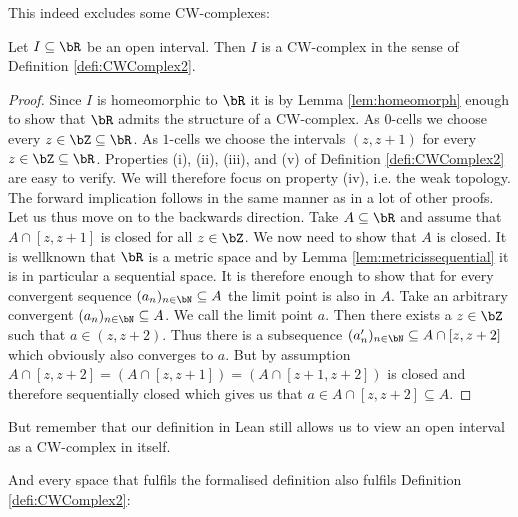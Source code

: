 This indeed excludes some CW-complexes:

\begin{example}
  Let $I \subseteq \bR$ be an open interval.
  Then $I$ is a CW-complex in the sense of Definition \ref{defi:CWComplex2}.
\end{example}
\begin{proof}
  Since $I$ is homeomorphic to $\bR$ it is by Lemma \ref{lem:homeomorph} enough to show that $\bR$ admits the structure of a CW-complex.
  As $0$-cells we choose every $z \in \bZ \subseteq \bR$.
  As $1$-cells we choose the intervals $(z, z + 1)$ for every $z \in \bZ \subseteq \bR$.
  Properties (i), (ii), (iii), and (v) of Definition \ref{defi:CWComplex2} are easy to verify.
  We will therefore focus on property (iv), i.e. the weak topology.
  The forward implication follows in the same manner as in a lot of other proofs.
  Let us thus move on to the backwards direction.
  Take $A \subseteq \bR$ and assume that $A \cap [z, z + 1]$ is closed for all $z \in \bZ$.
  We now need to show that $A$ is closed.
  It is wellknown that $\bR$ is a metric space and by Lemma \ref{lem:metricissequential} it is in particular a sequential space.
  It is therefore enough to show that for every convergent sequence $(a_n)_{n \in \bN} \subseteq A$ the limit point is also in $A$.
  Take an arbitrary convergent $(a_n)_{n \in \bN} \subseteq A$.
  We call the limit point $a$.
  Then there exists a $z \in \bZ$ such that $a \in (z, z + 2)$.
  Thus there is a subsequence $(a'_n)_{n \in \bN} \subseteq A \cap [z, z + 2]$ which obviously also converges to $a$.
  But by assumption $A \cap [z, z + 2] = (A \cap [z, z + 1]) = (A \cap [z + 1, z + 2])$ is closed and therefore sequentially closed which gives us that $a \in A \cap [z, z + 2] \subseteq A$.
\end{proof}

But remember that our definition in Lean still allows us to view an open interval as a CW-complex in itself.

And every space that fulfils the formalised definition also fulfils Definition \ref{defi:CWComplex2}:

